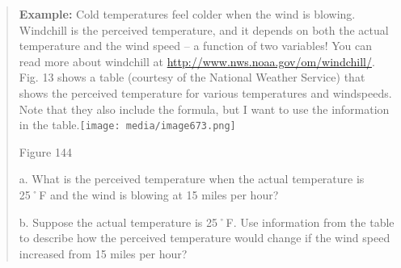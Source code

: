 \begin{quote}
\textbf{Example:} Cold temperatures feel colder when the wind is
blowing. Windchill is the perceived temperature, and it depends on both
the actual temperature and the wind speed -- a function of two
variables! You can read more about windchill at
\url{http://www.nws.noaa.gov/om/windchill/}. Fig. 13 shows a table
(courtesy of the National Weather Service) that shows the perceived
temperature for various temperatures and windspeeds. Note that they also
include the formula, but I want to use the information in the
table.\texttt{[image: media/image673.png]}

Figure 144

a. What is the perceived temperature when the actual temperature is 25˚F
and the wind is blowing at 15 miles per hour?

b. Suppose the actual temperature is 25˚F. Use information from the
table to describe how the perceived temperature would change if the wind
speed increased from 15 miles per hour?
\end{quote}

\textbf{\\
}

